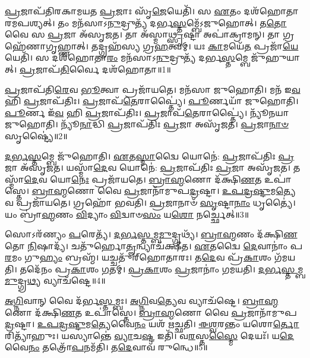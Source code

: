 \-\ul{𑌪𑍍𑌰}\-𑌜𑌾𑌪᳴𑌤𑌿𑌰𑌕𑌾𑌮𑌯𑌤 \ul{𑌪𑍍𑌰}\-𑌜𑌾𑌃 𑌸𑍃᳴\-\ul{𑌜𑍇}\-𑌯𑍇𑌤𑌿᳴।
𑌸 \ul{𑌏}\-𑌤𑌂 𑌦𑌶᳴𑌹𑍋𑌤𑌾𑌰𑌮\-𑌪𑌶𑍍𑌯𑌤𑍍।
𑌤𑌂 𑌮𑌨᳴𑌸𑌾\-𑌽\-\ul{𑌨𑍁}\-𑌦𑍍𑌰𑍁𑌤𑍍𑌯᳴ 𑌦𑌰𑍍𑌭\-\ul{𑌸𑍍𑌤}\-𑌮𑍍𑌬𑍇᳴\-𑌽𑌜𑍁𑌹𑍋𑌤𑍍।
𑌤\-\ul{𑌤𑍋} 𑌵𑍈 𑌸 \ul{𑌪𑍍𑌰}\-𑌜𑌾 𑌅᳴\-𑌸𑍃𑌜𑌤।
𑌤𑌾 𑌅᳴𑌸𑍍𑌮𑌾\-\ul{𑌥𑍍𑌸𑍃}\-𑌷𑍍𑌟𑌾 𑌅𑌪𑌾॑𑌕𑍍𑌰𑌾𑌮𑌨𑍍।
𑌤𑌾 𑌗𑍍𑌰𑌹𑍇᳴𑌣𑌾𑌗𑍃𑌹𑍍𑌣𑌾𑌤𑍍।
𑌤𑌦𑍍𑌗𑍍𑌰𑌹᳴𑌸𑍍𑌯 𑌗𑍍𑌰\-\ul{𑌹}\-𑌤𑍍𑌵𑌮𑍍।
𑌯𑌃 \ul{𑌕𑌾}\-𑌮𑌯𑍇᳴\-\ul{𑌤} 𑌪𑍍𑌰𑌜𑌾᳴\-\ul{𑌯𑍇}\-𑌯𑍇𑌤𑌿᳴।
𑌸 𑌦𑌶᳴𑌹𑍋𑌤𑌾\-\ul{𑌰𑌂} 𑌮𑌨᳴𑌸𑌾\-𑌽\-\ul{𑌨𑍁}\-𑌦𑍍𑌰𑍁𑌤𑍍𑌯᳴ 𑌦𑌰𑍍𑌭\-\ul{𑌸𑍍𑌤}\-𑌮𑍍𑌬𑍇 𑌜𑍁᳴𑌹𑍁𑌯𑌾𑌤𑍍।
\-\ul{𑌪𑍍𑌰}\-𑌜𑌾𑌪᳴\-\ul{𑌤𑌿}\-𑌰𑍍𑌵𑍈 𑌦𑌶᳴𑌹𑍋𑌤𑌾॥1॥

\-\ul{𑌪𑍍𑌰}\-𑌜𑌾𑌪᳴𑌤𑌿\-\ul{𑌰𑍇}\-𑌵 \ul{𑌭𑍂}\-𑌤𑍍𑌵𑌾 𑌪𑍍𑌰𑌜𑌾᳴𑌯𑌤𑍇।
𑌮𑌨᳴𑌸𑌾 𑌜𑍁𑌹𑍋𑌤𑌿।
𑌮𑌨᳴ 𑌇\-\ul{𑌵} 𑌹𑌿 \ul{𑌪𑍍𑌰}\-𑌜𑌾\-𑌪᳴𑌤𑌿𑌃।
\-\ul{𑌪𑍍𑌰}\-𑌜𑌾𑌪᳴\-\ul{𑌤𑍇}\-𑌰𑌾𑌪𑍍𑌤𑍍𑌯𑍈॑।
\-\ul{𑌪𑍂}\-𑌰𑍍𑌣𑌯𑌾᳴ 𑌜𑍁𑌹𑍋𑌤𑌿।
\-\ul{𑌪𑍂}\-𑌰𑍍𑌣 𑌇᳴\-\ul{𑌵} 𑌹𑌿 \ul{𑌪𑍍𑌰}\-𑌜𑌾\-𑌪᳴𑌤𑌿𑌃।
\-\ul{𑌪𑍍𑌰}\-𑌜𑌾𑌪᳴\-\ul{𑌤𑍇}\-𑌰𑌾𑌪𑍍𑌤𑍍𑌯𑍈॑।
𑌨𑍍𑌯𑍂᳴𑌨𑌯𑌾 𑌜𑍁𑌹𑍋𑌤𑌿।
𑌨𑍍𑌯𑍂᳴\-\ul{𑌨𑌾}\-𑌦𑍍𑌧𑌿 \ul{𑌪𑍍𑌰}\-𑌜𑌾\-𑌪᳴𑌤𑌿𑌃 \ul{𑌪𑍍𑌰}\-𑌜𑌾 𑌅𑌸𑍃᳴𑌜𑌤।
\-\ul{𑌪𑍍𑌰}\-𑌜𑌾\-\ul{𑌨𑌾}\-\-\ul{𑍞} 𑌸𑍃𑌷𑍍𑌟𑍍𑌯𑍈॑॥2॥

\-\ul{𑌦}\-\-\ul{𑌰𑍍𑌭}\-\-\ul{𑌸𑍍𑌤}\-𑌮𑍍𑌬𑍇 𑌜𑍁᳴𑌹𑍋𑌤𑌿।
\-\ul{𑌏}\-𑌤\-\ul{𑌸𑍍𑌮𑌾}\-𑌦𑍍𑌵𑍈 𑌯𑍋𑌨𑍇॑: \ul{𑌪𑍍𑌰}\-𑌜𑌾\-𑌪᳴𑌤𑌿𑌃 \ul{𑌪𑍍𑌰}\-𑌜𑌾 𑌅᳴\-𑌸𑍃𑌜𑌤।
𑌯𑌸𑍍𑌮𑌾᳴\-\ul{𑌦𑍇}\-𑌵 𑌯𑍋𑌨𑍇॑: \ul{𑌪𑍍𑌰}\-𑌜𑌾\-𑌪᳴𑌤𑌿𑌃 \ul{𑌪𑍍𑌰}\-𑌜𑌾 𑌅𑌸𑍃᳴𑌜𑌤।
𑌤𑌸𑍍𑌮𑌾᳴\-\ul{𑌦𑍇}\-𑌵 𑌯𑍋\-\ul{𑌨𑍇𑌃} 𑌪𑍍𑌰𑌜𑌾᳴𑌯𑌤𑍇।
\-\ul{𑌬𑍍𑌰𑌾}\-\-\ul{𑌹𑍍𑌮}\-𑌣𑍋 𑌦᳴𑌕𑍍𑌷𑌿\-\ul{𑌣}\-𑌤 𑌉𑌪𑌾॑𑌸𑍍𑌤𑍇।
\-\ul{𑌬𑍍𑌰𑌾}\-\-\ul{𑌹𑍍𑌮}\-𑌣𑍋 𑌵𑍈 \ul{𑌪𑍍𑌰}\-𑌜𑌾𑌨𑌾᳴𑌮𑍁𑌪\-\ul{𑌦𑍍𑌰}\-𑌷𑍍𑌟𑌾।
\-\ul{𑌉}\-\-\ul{𑌪}\-\-\ul{𑌦𑍍𑌰}\-\-\ul{𑌷𑍍𑌟𑍁}\-𑌮\-\ul{𑌤𑍍𑌯𑍇}\-𑌵 𑌪𑍍𑌰𑌜𑌾᳴𑌯𑌤𑍇।
𑌗𑍍𑌰𑌹𑍋᳴ 𑌭𑌵𑌤𑌿।
\-\ul{𑌪𑍍𑌰}\-𑌜𑌾𑌨𑌾𑍞᳴ \ul{𑌸𑍃}\-𑌷𑍍𑌟𑌾\-\ul{𑌨𑌾𑌂} 𑌧𑍃𑌤𑍍𑌯𑍈॑।
𑌯𑌂 𑌬𑍍𑌰𑌾॑\-\ul{𑌹𑍍𑌮}\-𑌣𑌂 \ul{𑌵𑌿}\-𑌦𑍍𑌯𑌾𑌂 \ul{𑌵𑌿}\-𑌦𑍍𑌵𑌾𑍞\-\ul{𑌸𑌂} 𑌯\-\ul{𑌶𑍋} 𑌨𑌰𑍍𑌚𑍍𑌛𑍇𑌤𑍍॥3॥

𑌸𑍋𑌽𑌰᳴𑌣𑍍𑌯𑌂 \ul{𑌪}\-𑌰𑍇𑌤𑍍𑌯᳴।
\-\ul{𑌦}\-\-\ul{𑌰𑍍𑌭}\-\-\ul{𑌸𑍍𑌤}\-𑌮𑍍𑌬\-\ul{𑌮𑍁}\-𑌦𑍍𑌗𑍍𑌰𑌥𑍍𑌯᳴।
\-\ul{𑌬𑍍𑌰𑌾}\-\-\ul{𑌹𑍍𑌮}\-𑌣𑌂 𑌦᳴𑌕𑍍𑌷𑌿\-\ul{𑌣}\-𑌤𑍋 \ul{𑌨𑌿}\-𑌷𑌾𑌦𑍍𑌯᳴।
𑌚𑌤𑍁᳴𑌰𑍍\mbox{}𑌹𑍋\-\ul{𑌤𑍄}\-𑌨𑍍𑌵𑍍𑌯𑌾𑌚᳴𑌕𑍍𑌷𑍀𑌤।
\-\ul{𑌏}\-𑌤𑌦𑍍𑌵𑍈 \ul{𑌦𑍇}\-𑌵𑌾𑌨𑌾𑌂॑ 𑌪\-\ul{𑌰}\-𑌮𑌂 𑌗𑍁\-\ul{𑌹𑍍𑌯𑌂} 𑌬𑍍𑌰𑌹𑍍𑌮᳴।
𑌯𑌚𑍍𑌚𑌤𑍁᳴𑌰𑍍‌\mbox{}𑌹𑍋𑌤𑌾𑌰𑌃।
𑌤\-\ul{𑌦𑍇}\-𑌵 𑌪𑍍𑌰᳴\-\ul{𑌕𑌾}\-𑌶𑌂 𑌗᳴𑌮𑌯𑌤𑌿।
𑌤𑌦𑍇᳴𑌨𑌂 𑌪𑍍𑌰\-\ul{𑌕𑌾}\-𑌶𑌂 \ul{𑌗}\-𑌤𑌮𑍍।
\-\ul{𑌪𑍍𑌰}\-\-\ul{𑌕𑌾}\-𑌶𑌂 \ul{𑌪𑍍𑌰}\-𑌜𑌾𑌨𑌾𑌂॑ 𑌗𑌮𑌯𑌤𑌿।
\-\ul{𑌦}\-\-\ul{𑌰𑍍𑌭}\-\-\ul{𑌸𑍍𑌤}\-𑌮𑍍𑌬\-\ul{𑌮𑍁}\-𑌦𑍍𑌗𑍍𑌰\-\ul{𑌥𑍍𑌯} 𑌵𑍍𑌯𑌾𑌚᳴𑌷𑍍𑌟𑍇॥4॥

\-\ul{𑌅}\-\-\ul{𑌗𑍍𑌨𑌿}\-𑌵𑌾𑌨𑍍 𑌵𑍈 𑌦᳴𑌰𑍍𑌭\-\ul{𑌸𑍍𑌤}\-𑌮𑍍𑌬𑌃।
\-\ul{𑌅}\-\-\ul{𑌗𑍍𑌨𑌿}\-𑌵\-\ul{𑌤𑍍𑌯𑍇}\-𑌵 𑌵𑍍𑌯𑌾𑌚᳴𑌷𑍍𑌟𑍇।
\-\ul{𑌬𑍍𑌰𑌾}\-\-\ul{𑌹𑍍𑌮}\-𑌣𑍋 𑌦᳴𑌕𑍍𑌷𑌿\-\ul{𑌣}\-𑌤 𑌉𑌪𑌾॑𑌸𑍍𑌤𑍇।
\-\ul{𑌬𑍍𑌰𑌾}\-\-\ul{𑌹𑍍𑌮}\-𑌣𑍋 𑌵𑍈 \ul{𑌪𑍍𑌰}\-𑌜𑌾𑌨𑌾᳴𑌮𑍁𑌪\-\ul{𑌦𑍍𑌰}\-𑌷𑍍𑌟𑌾।
\-\ul{𑌉}\-\-\ul{𑌪}\-\-\ul{𑌦𑍍𑌰}\-\-\ul{𑌷𑍍𑌟𑍁}\-𑌮\-\ul{𑌤𑍍𑌯𑍇}\-𑌵𑍈\-\ul{𑌨𑌂} 𑌯𑌶᳴ 𑌋𑌚𑍍𑌛𑌤𑌿।
\-\ul{𑌈}\-\-\ul{𑌶𑍍𑌵}\-𑌰𑌨𑍍𑌤𑌂 𑌯𑌶𑍋\-\ul{𑌰𑍍𑌤𑍋}\-𑌰𑌿𑌤𑍍𑌯𑌾᳴𑌹𑍁𑌃।
𑌯𑌸𑍍𑌯𑌾𑌨𑍍𑌤𑍇॑ \ul{𑌵𑍍𑌯𑌾}\-𑌚\-\ul{𑌷𑍍𑌟} 𑌇𑌤𑌿᳴।
𑌵\-\ul{𑌰}\-𑌸𑍍𑌤\-\ul{𑌸𑍍𑌮𑍈} 𑌦𑍇𑌯𑌃᳴।
𑌯\-\ul{𑌦𑍇}\-𑌵𑍈\-\ul{𑌨𑌂} 𑌤𑌤𑍍𑌰𑍋᳴\-\ul{𑌪}\-𑌨𑌮᳴𑌤𑌿।
𑌤\-\ul{𑌦𑍇}\-𑌵𑌾𑌵᳴ 𑌰𑍁𑌨𑍍𑌧𑍇॥5॥

